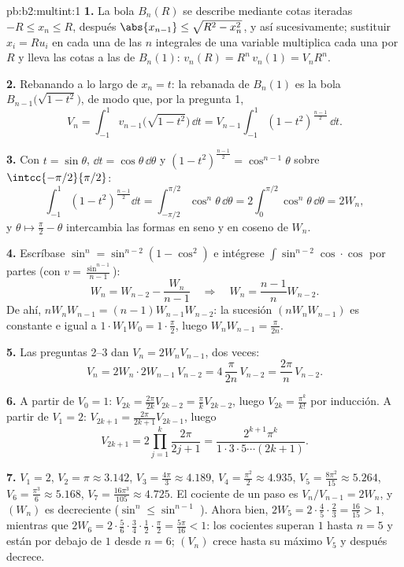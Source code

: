 \begin{solution}{pb:b2:multint:1}
\textbf{1.} La bola $B_n(R)$ se describe mediante cotas iteradas $-R
\leq x_n \leq R$, después $\abs{x_{n-1}} \leq \sqrt{R^2 - x_n^2}$, y
así sucesivamente; sustituir $x_i = Ru_i$ en cada una de las $n$
integrales de una variable multiplica cada una por $R$ y lleva las
cotas a las de $B_n(1)$: $v_n(R) = R^n\,v_n(1) = V_nR^n$.

\textbf{2.} Rebanando a lo largo de $x_n = t$: la rebanada de
$B_n(1)$ es la bola $B_{n-1}\bigl(\sqrt{1 - t^2}\bigr)$, de modo que,
por la pregunta 1,
\[
V_n = \int_{-1}^1 v_{n-1}\bigl(\sqrt{1 - t^2}\bigr)\,\dd t
= V_{n-1}\int_{-1}^{1}(1 - t^2)^{\frac{n-1}2}\,\dd t .
\]

\textbf{3.} Con $t = \sin\theta$, $\dd t = \cos\theta\,\dd\theta$ y
$(1 - t^2)^{\frac{n-1}2} = \cos^{n-1}\theta$ sobre
$\intcc{-\pi/2}{\pi/2}$:
\[
\int_{-1}^1(1 - t^2)^{\frac{n-1}2}\dd t
= \int_{-\pi/2}^{\pi/2}\cos^n\theta\,\dd\theta
= 2\int_0^{\pi/2}\cos^n\theta\,\dd\theta = 2W_n,
\]
y $\theta \mapsto \frac\pi2 - \theta$ intercambia las formas en seno
y en coseno de $W_n$.

\textbf{4.} Escríbase $\sin^n = \sin^{n-2}(1 - \cos^2)$ e intégrese
$\int\sin^{n-2}\cos\cdot\cos$ por partes (con $v =
\frac{\sin^{n-1}}{n-1}$):
\[
W_n = W_{n-2} - \frac{W_n}{n-1}
\quad\Longrightarrow\quad
W_n = \frac{n-1}{n}W_{n-2}.
\]
De ahí, $nW_nW_{n-1} = (n-1)W_{n-1}W_{n-2}$: la sucesión
$(nW_nW_{n-1})$ es constante e igual a $1\cdot W_1W_0 =
1\cdot\frac\pi2$, luego $W_nW_{n-1} = \frac{\pi}{2n}$.

\textbf{5.} Las preguntas 2--3 dan $V_n = 2W_nV_{n-1}$, dos veces:
\[
V_n = 2W_n\cdot 2W_{n-1}\,V_{n-2}
= 4\,\frac{\pi}{2n}\,V_{n-2} = \frac{2\pi}n\,V_{n-2}.
\]

\textbf{6.} A partir de $V_0 = 1$: $V_{2k} = \frac{2\pi}{2k}V_{2k-2}
= \frac\pi kV_{2k-2}$, luego $V_{2k} = \frac{\pi^k}{k!}$ por
inducción. A partir de $V_1 = 2$: $V_{2k+1} =
\frac{2\pi}{2k+1}V_{2k-1}$, luego
\[
V_{2k+1} = 2\prod_{j=1}^k\frac{2\pi}{2j+1}
= \frac{2^{k+1}\pi^k}{1\cdot3\cdot5\cdots(2k+1)} .
\]

\textbf{7.} $V_1 = 2$, $V_2 = \pi \approx 3.142$, $V_3 =
\frac{4\pi}3 \approx 4.189$, $V_4 = \frac{\pi^2}2 \approx 4.935$,
$V_5 = \frac{8\pi^2}{15} \approx 5.264$, $V_6 = \frac{\pi^3}6 \approx
5.168$, $V_7 = \frac{16\pi^3}{105} \approx 4.725$. El cociente de un
paso es $V_n/V_{n-1} = 2W_n$, y $(W_n)$ es decreciente ($\sin^n \leq
\sin^{n-1}$ ). Ahora bien, $2W_5 =
2\cdot\frac45\cdot\frac23 = \frac{16}{15} > 1$, mientras que $2W_6 =
2\cdot\frac56\cdot\frac34\cdot\frac12\cdot\frac\pi2 = \frac{5\pi}{16}
< 1$: los cocientes superan $1$ hasta $n = 5$ y están por debajo de
$1$ desde $n = 6$; $(V_n)$ crece hasta su máximo $V_5$ y después
decrece.


\end{solution}
